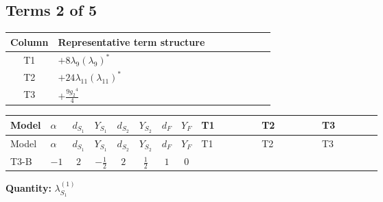 \documentclass[8pt]{article}
\begin{document}
\begin{landscape}
\subsection*{Terms 2 of 5}
\begin{center}
\begin{tabular}{@{}c >{\raggedright\arraybackslash}p{0.82\linewidth}@{}}
\toprule
Column & Representative term structure \\
\midrule
T1 & \(\displaystyle +8 {\lambda_{9}} \left({\lambda_{9}}\right)^{*}\) \\
\midrule
T2 & \(\displaystyle +24 {\lambda_{11}} \left({\lambda_{11}}\right)^{*}\) \\
\midrule
T3 & \(\displaystyle +\frac{9 {g_2}^4}{4}\) \\
\midrule
\bottomrule
\end{tabular}
\end{center}
\smallskip
\tiny
\begin{longtable}{@{}llcccccc >{\raggedright\arraybackslash}p{0.21\linewidth} >{\raggedright\arraybackslash}p{0.21\linewidth} >{\raggedright\arraybackslash}p{0.21\linewidth}@{}}
\toprule
Model & $\alpha$ & $d_{S_1}$ & $Y_{S_1}$ & $d_{S_2}$ & $Y_{S_2}$ & $d_F$ & $Y_F$ & T1 & T2 & T3 \\
\midrule
\endfirsthead
\toprule
Model & $\alpha$ & $d_{S_1}$ & $Y_{S_1}$ & $d_{S_2}$ & $Y_{S_2}$ & $d_F$ & $Y_F$ & T1 & T2 & T3 \\
\midrule
\endhead
T3-B & $-1$ & $2$ & $-\frac{1}{2}$ & $2$ & $\frac{1}{2}$ & $1$ & $0$ & \scriptsize\adjustbox{max width=\linewidth}{$\begin{gathered} +8 {\lambda_{9}} \left({\lambda_{9}}\right)^{*}\end{gathered}$} & \scriptsize\adjustbox{max width=\linewidth}{$\begin{gathered} +24 {\lambda_{11}} \left({\lambda_{11}}\right)^{*}\end{gathered}$} & \scriptsize\adjustbox{max width=\linewidth}{$\begin{gathered} +\frac{9 {g_2}^4}{4}\end{gathered}$} \\
\midrule
\bottomrule
\end{longtable}
\clearpage
\noindent\textbf{Quantity: }$\lambda_{S_1}^{(1)}$\par\smallskip

\end{landscape}
\end{document}
